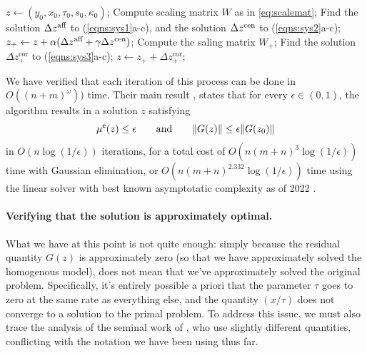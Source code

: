 \begin{subappendices}
\begin{lproof}
    \begin{algorithm}
        \caption{~[\citeauthor*{badenbroek2021algorithm}]}
        \label{algo:dahl-primal-dual}
        \singlespacingplus
    \begin{algorithmic}
        \STATE $z \gets (y_0, x_0, \tau_0, s_0, \kappa_0)$;
        \WHILE{}
            \STATE Compute scaling matrix $W$ as in \eqref{eq:scalemat};
            \STATE Find the solution $\Delta {z}^{\text{aff}}$ to (\ref{eqns:sys1}a-c),
                and the solution $\Delta {z}^{\text{cen}}$ to (\ref{eqns:sys2}a-c);
            \STATE $z_+ \gets z + \alpha (\Delta {z}^{\text{aff}} + \gamma \Delta {z}^{\text{cen}})$;
            \STATE Compute the saling matrix $W_+$;
            \STATE Find the solution $\Delta z^{\text{cor}}_+$ to (\ref{eqns:sys3}a-c);
            \STATE $z \gets z_+ + \Delta z_+^{\text{cor}}$;
        \ENDWHILE
    \end{algorithmic}
    \end{algorithm}

    We have verified that each iteration of this process can be done in $O((n+m)^\omega))$ time.
    Their main result \parencite[Theorem 3]{badenbroek2021algorithm}, states that for every $\epsilon \in (0,1)$,
    the algorithm results in a solution $z$ satisfying
    \[
        \mu^{\sf e}(z)
        \le \epsilon
        \qquad \text{and}\qquad
        \Vert G(z) \Vert \le \epsilon
            \Vert G(z_0) \Vert
    \]
    in $O(n \log (1/\epsilon))$ iterations,
    for a total cost of
    $O(n (m+n)^3 \log (1/\epsilon) )$ time with Gaussian elimination, or
    $O(n (m+n)^{2.332} \log (1/\epsilon) )$ time using the linear solver with best
         known asymptotatic complexity as of 2022 \cite{duan2022faster}.


    \paragraph{Verifying that the solution is approximately optimal.}
    What we have at this point is not quite enough: simply because the residual quantity $G(z)$ is approximately zero (so that we have approximately solved the homogenous model), does not mean that we've approximately solved the original problem.
    Specifically, it's entirely possible a priori that the parameter $\tau$ goes to zero at the same rate as everything else, and the quantity $(x/\tau)$ does not converge to a solution to the primal problem.
    To address this issue, we must also trace the analysis of the seminal work of \textcite{nesterov1996infeasible}, who use slightly different quantities, conflicting with the notation we have been using thus far.



\end{lproof}
\end{subappendices}
